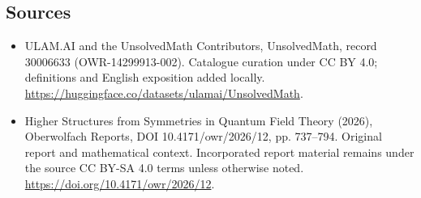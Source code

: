 \documentclass[11pt]{article}
\begin{document}
\subsection{Sources}
\begin{itemize}
\item[\hypertarget{source:30006633:1}{S1}] ULAM.AI and the UnsolvedMath Contributors, UnsolvedMath, record 30006633 (OWR-14299913-002). Catalogue curation under CC BY 4.0; definitions and English exposition added locally.
\url{https://huggingface.co/datasets/ulamai/UnsolvedMath}.
\item[\hypertarget{source:30006633:2}{S2}] Higher Structures from Symmetries in Quantum Field Theory (2026), Oberwolfach Reports, DOI 10.4171/owr/2026/12, pp. 737--794. Original report and mathematical context. Incorporated report material remains under the source CC BY-SA 4.0 terms unless otherwise noted.
\url{https://doi.org/10.4171/owr/2026/12}.
\end{itemize}
\label{end:30006633}
\end{document}
